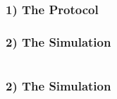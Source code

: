 \documentclass{beamer}
\begin{document}
\begin{frame}
	\frametitle{1) The Protocol}


\end{frame}

\begin{frame}
	\frametitle{2) The Simulation}

	\begin{columns}
		\begin{column}{0.3\textwidth}
			\centering
			
		\end{column}

		\begin{column}{0.7\textwidth}
			\centering

		\end{column}
	\end{columns}	
\end{frame}

\begin{frame}
	\frametitle{2) The Simulation}

	
\end{frame}
\end{document}
